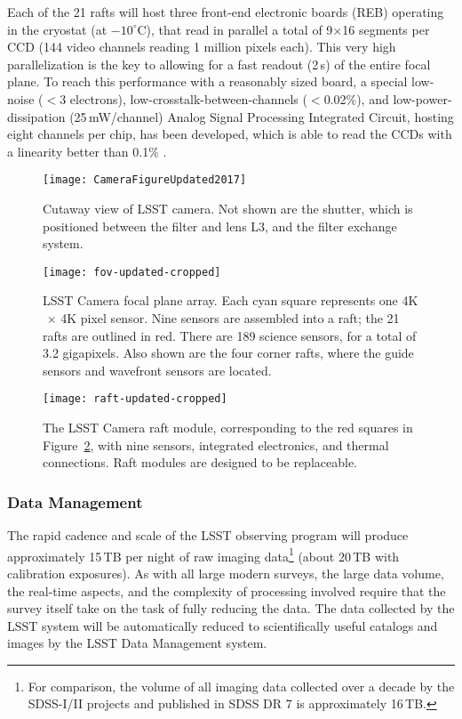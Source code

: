 Each of the 21 rafts will host three front-end electronic boards (REB) operating in the cryostat
(at $-10^\circ$C), that read in parallel a total of 9$\times$16 segments per CCD (144 video
channels reading 1 million pixels each). This very high parallelization is the key to allowing
for a fast readout (2\,s) of the entire focal plane. To reach this performance with a
reasonably sized board, a special low-noise ($<$3 electrons), low-crosstalk-between-channels
($<$0.02\%), and low-power-dissipation (25\,mW/channel) Analog Signal Processing Integrated
Circuit,  hosting eight channels per chip, has been developed, which is able to read the
CCDs with a linearity better than 0.1\% \citep{1748-0221-12-03-C03017}.

\begin{figure}[t!]
\texttt{[image: CameraFigureUpdated2017]}
\caption{Cutaway view of LSST camera. Not shown are the shutter, which is positioned between the filter and lens L3, and the filter exchange system.}
\label{Fig:camera}
\end{figure}


\begin{figure}[ht]
\texttt{[image: fov-updated-cropped]}
\caption{LSST Camera focal plane array. Each cyan square represents one
4K$\,\times\,$4K pixel sensor. Nine sensors are assembled into a
raft; the 21 rafts are outlined in red. There are 189 science sensors, for a total of 3.2 gigapixels. Also shown are the four corner rafts, where the guide sensors and wavefront sensors are located.}
\label{Fig:fov}
\end{figure}

\begin{figure}[ht]
\texttt{[image: raft-updated-cropped]}
\caption{The LSST Camera raft module, corresponding to the red squares
in Figure~\ref{Fig:fov}, with nine sensors, integrated electronics,
and thermal connections. Raft modules are designed to be replaceable.}
\label{Fig:raft}
\end{figure}


\subsubsection{Data Management}
\label{sec:dm}

The rapid cadence and scale of the LSST observing program will produce
approximately 15\,TB per night of raw imaging data\footnote{For
  comparison, the volume of all imaging data collected over a decade
  by the SDSS-I/II projects
  and published in SDSS DR 7 \citep{2009ApJS..182..543A} is
  approximately 16\,TB.} (about 20\,TB with calibration exposures). As with
all large modern surveys, the large data volume, the
real-time aspects, and the complexity of processing involved require
that the survey itself take on the task of fully reducing the data.
The data collected by the LSST
system will be automatically reduced to scientifically useful catalogs
and images by the LSST Data Management
\citep[DM;][]{2017ASPC..512..279J} system.

